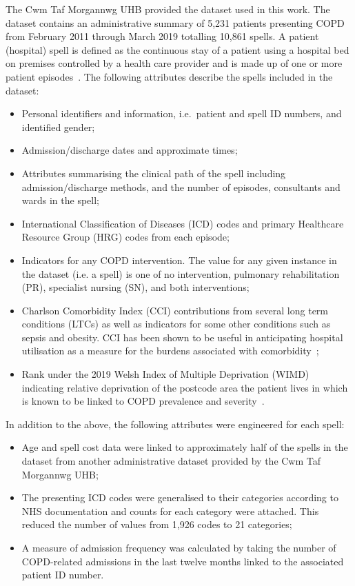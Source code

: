\documentclass[11pt]{article}
\begin{document}
The Cwm Taf Morgannwg UHB provided the dataset used in this work. The
dataset contains an administrative summary of 5,231 patients presenting COPD
from February 2011 through March 2019 totalling 10,861 spells. A patient
(hospital) spell is defined as the continuous stay of a patient using a hospital
bed on premises controlled by a health care provider and is made up of one or
more patient episodes~\cite{NHS2020}. The following attributes describe the
spells included in the dataset:
\begin{itemize}
    \item Personal identifiers and information, i.e.\ patient and spell ID
        numbers, and identified gender;
    \item Admission/discharge dates and approximate times;
    \item Attributes summarising the clinical path of the spell including
        admission/discharge methods, and the number of episodes, consultants and
        wards in the spell;
    \item International Classification of Diseases (ICD) codes and primary
        Healthcare Resource Group (HRG) codes from each episode;
    \item Indicators for any COPD intervention. The value for any given instance
        in the dataset (i.e. a spell) is one of no intervention, pulmonary
        rehabilitation (PR), specialist nursing (SN), and both interventions;
    \item Charlson Comorbidity Index (CCI) contributions from several long term
        conditions (LTCs) as well as indicators for some other conditions such
        as sepsis and obesity. CCI has been shown to be useful in anticipating
        hospital utilisation as a measure for the burdens associated with
        comorbidity~\cite{Simon2011};
    \item Rank under the 2019 Welsh Index of Multiple Deprivation (WIMD)
        indicating relative deprivation of the postcode area the patient lives
        in which is known to be linked to COPD prevalence and
        severity~\cite{Collins2018,Sexton2016,Steiner2017}.
\end{itemize}

In addition to the above, the following attributes were engineered for each
spell:
\begin{itemize}
    \item Age and spell cost data were linked to approximately half of the
        spells in the dataset from another administrative dataset provided by
        the Cwm Taf Morgannwg UHB;
    \item The presenting ICD codes were generalised to their categories
        according to NHS documentation and counts for each category were
        attached. This reduced the number of values from
        1,926 codes to 21 categories;
    \item A measure of admission frequency was calculated by taking the number
        of COPD-related admissions in the last twelve months linked to the
        associated patient ID number.
\end{itemize}
\end{document}
